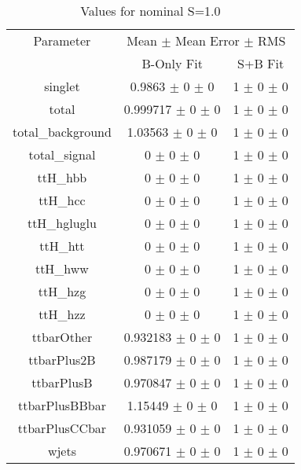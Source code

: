 \begin{table}
\centering
\caption{Values for nominal S=1.0}
\begin{tabular}{ccc}
\toprule
Parameter & \multicolumn{2}{c}{Mean $\pm$ Mean Error $\pm$ RMS}\\
 & B-Only Fit & S+B Fit\\
\midrule
singlet & \num{0.9863} $\pm$ \num{0} $\pm$ \num{0} & \num{1} $\pm$ \num{0} $\pm$ \num{0}\\
total & \num{0.999717} $\pm$ \num{0} $\pm$ \num{0} & \num{1} $\pm$ \num{0} $\pm$ \num{0}\\
total\_background & \num{1.03563} $\pm$ \num{0} $\pm$ \num{0} & \num{1} $\pm$ \num{0} $\pm$ \num{0}\\
total\_signal & \num{0} $\pm$ \num{0} $\pm$ \num{0} & \num{1} $\pm$ \num{0} $\pm$ \num{0}\\
ttH\_hbb & \num{0} $\pm$ \num{0} $\pm$ \num{0} & \num{1} $\pm$ \num{0} $\pm$ \num{0}\\
ttH\_hcc & \num{0} $\pm$ \num{0} $\pm$ \num{0} & \num{1} $\pm$ \num{0} $\pm$ \num{0}\\
ttH\_hgluglu & \num{0} $\pm$ \num{0} $\pm$ \num{0} & \num{1} $\pm$ \num{0} $\pm$ \num{0}\\
ttH\_htt & \num{0} $\pm$ \num{0} $\pm$ \num{0} & \num{1} $\pm$ \num{0} $\pm$ \num{0}\\
ttH\_hww & \num{0} $\pm$ \num{0} $\pm$ \num{0} & \num{1} $\pm$ \num{0} $\pm$ \num{0}\\
ttH\_hzg & \num{0} $\pm$ \num{0} $\pm$ \num{0} & \num{1} $\pm$ \num{0} $\pm$ \num{0}\\
ttH\_hzz & \num{0} $\pm$ \num{0} $\pm$ \num{0} & \num{1} $\pm$ \num{0} $\pm$ \num{0}\\
ttbarOther & \num{0.932183} $\pm$ \num{0} $\pm$ \num{0} & \num{1} $\pm$ \num{0} $\pm$ \num{0}\\
ttbarPlus2B & \num{0.987179} $\pm$ \num{0} $\pm$ \num{0} & \num{1} $\pm$ \num{0} $\pm$ \num{0}\\
ttbarPlusB & \num{0.970847} $\pm$ \num{0} $\pm$ \num{0} & \num{1} $\pm$ \num{0} $\pm$ \num{0}\\
ttbarPlusBBbar & \num{1.15449} $\pm$ \num{0} $\pm$ \num{0} & \num{1} $\pm$ \num{0} $\pm$ \num{0}\\
ttbarPlusCCbar & \num{0.931059} $\pm$ \num{0} $\pm$ \num{0} & \num{1} $\pm$ \num{0} $\pm$ \num{0}\\
wjets & \num{0.970671} $\pm$ \num{0} $\pm$ \num{0} & \num{1} $\pm$ \num{0} $\pm$ \num{0}\\
\bottomrule
\end{tabular}
\end{table}